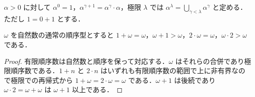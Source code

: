 \begin{defn}[順序数の累乗]
$\alpha>0$ に対して $\alpha^0=1$，$\alpha^{\gamma+1}=\alpha^\gamma\cdot\alpha$，極限 $\lambda$ では $\alpha^\lambda=\bigcup_{\gamma<\lambda}\alpha^\gamma$ と定める．ただし $1=0+1$ とする．
\end{defn}
\begin{example}[順序数演算の非可換性]
$\omega$ を自然数の通常の順序型とすると $1+\omega=\omega$，$\omega+1>\omega$，$2\cdot\omega=\omega$，$\omega\cdot2>\omega$ である．
\end{example}
\begin{proof}
有限順序数は自然数と順序を保って対応する．$\omega$ はそれらの合併であり極限順序数である．$1+n$ と $2\cdot n$ はいずれも有限順序数の範囲で上に非有界なので極限での再帰式から $1+\omega=2\cdot\omega=\omega$ である．$\omega+1$ は後続であり $\omega\cdot2=\omega+\omega$ は $\omega+1$ 以上である．
\end{proof}
